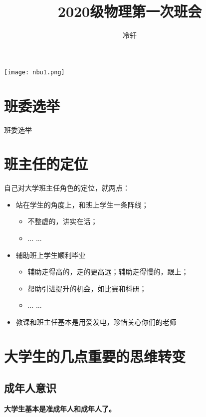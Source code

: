 \documentclass[cn,hazy,blue,14pt,screen]{elegantnote}
\title{2020级物理第一次班会}
\author{冷轩}
\date{\zhtoday}
\begin{document}
\maketitle

\centerline{
  \texttt{[image: nbu1.png]}
}

\newpage
\tableofcontents   \label{content}



\newpage
\section{班委选举}

{\centering \Large 班委选举}


\newpage
\section{班主任的定位}
自己对大学班主任角色的定位，就两点：
\begin{itemize}
\item 站在学生的角度上，和班上学生一条阵线；
\begin{itemize}
\item 不整虚的，讲实在话；
\item ... ...
\end{itemize}

\item 辅助班上学生顺利毕业
\begin{itemize}
\item 辅助走得高的，走的更高远；辅助走得慢的，跟上；
\item 帮助引进提升的机会，如比赛和科研；
\item ... ...
\end{itemize}

\item 教课和班主任基本是用爱发电，珍惜关心你们的老师~~
\end{itemize}



\newpage
\section{大学生的几点重要的思维转变}
\subsection{成年人意识}
{\bf 大学生基本是准成年人和成年人了。}
\end{document}
